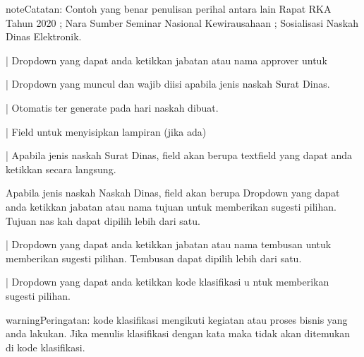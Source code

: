 \documentclass[letterpaper,10pt,bahasai]{sphinxmanual}
\begin{document}
\begin{sphinxadmonition}{note}{Catatan:}
Contoh yang benar penulisan perihal antara lain Rapat RKA Tahun 2020 ; Nara Sumber Seminar Nasional Kewirausahaan ; Sosialisasi Naskah Dinas Elektronik.
\end{sphinxadmonition}

 | Dropdown yang dapat anda ketikkan jabatan atau nama approver untuk

\noindent{}

   | Dropdown yang muncul dan wajib diisi apabila jenis naskah Surat Dinas.

\noindent{}

 | Otomatis ter generate pada hari naskah dibuat.

 | Field untuk menyisipkan lampiran (jika ada)

\noindent{}

   | Apabila jenis naskah Surat Dinas, field akan berupa textfield yang dapat anda ketikkan secara langsung.

\noindent{}

Apabila jenis naskah Naskah Dinas, field akan berupa Dropdown yang dapat anda ketikkan
jabatan atau nama tujuan untuk memberikan sugesti pilihan. Tujuan nas kah dapat dipilih
lebih dari satu.

\noindent{}

    | Dropdown yang dapat anda ketikkan jabatan atau nama tembusan untuk memberikan sugesti pilihan.
Tembusan dapat dipilih lebih dari satu.

\noindent{}

    | Dropdown yang dapat anda ketikkan kode klasifikasi u ntuk memberikan sugesti pilihan.

\noindent{}

\begin{sphinxadmonition}{warning}{Peringatan:}
kode klasifikasi mengikuti kegiatan atau proses bisnis yang anda lakukan. Jika menulis klasifikasi dengan kata  maka tidak akan ditemukan di kode klasifikasi.
\end{sphinxadmonition}
\end{document}
